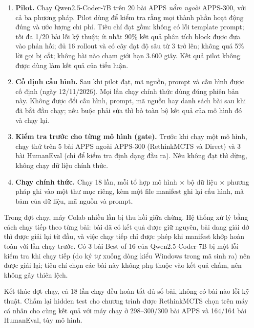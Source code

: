 \begin{enumerate}[label=\arabic*.]
  \item \textbf{Pilot.} Chạy Qwen2.5-Coder-7B trên 20 bài APPS \emph{nằm ngoài} APPS-300, với cả ba phương pháp. Pilot dùng để kiểm tra rằng mọi thành phần hoạt động đúng và ước lượng chi phí. Tiêu chí đạt gồm: không có lỗi template prompt; tối đa 1/20 bài lỗi kỹ thuật; ít nhất 90\% kết quả phân tích block được đưa vào phản hồi; đủ 16 rollout và có cây đạt độ sâu từ 3 trở lên; không quá 5\% lời gọi bị cắt; không bài nào chạm giới hạn 3.600 giây. Kết quả pilot không được dùng làm kết quả của tiểu luận.
  \item \textbf{Cố định cấu hình.} Sau khi pilot đạt, mã nguồn, prompt và cấu hình được cố định (ngày 12/11/2026). Mọi lần chạy chính thức dùng đúng phiên bản này. Không được đổi cấu hình, prompt, mã nguồn hay danh sách bài sau khi đã bắt đầu chạy; nếu buộc phải sửa thì bỏ toàn bộ kết quả của mô hình đó và chạy lại.
  \item \textbf{Kiểm tra trước cho từng mô hình (gate).} Trước khi chạy một mô hình, chạy thử trên 5 bài APPS ngoài APPS-300 (RethinkMCTS và Direct) và 3 bài HumanEval (chỉ để kiểm tra định dạng đầu ra). Nếu không đạt thì dừng, không chạy dữ liệu chính thức.
  \item \textbf{Chạy chính thức.} Chạy 18 lần, mỗi tổ hợp mô hình $\times$ bộ dữ liệu $\times$ phương pháp ghi vào một thư mục riêng, kèm một file manifest ghi lại cấu hình, mã băm của dữ liệu, mã nguồn và prompt.
\end{enumerate}

Trong đợt chạy, máy Colab nhiều lần bị thu hồi giữa chừng. Hệ thống xử lý bằng cách chạy tiếp theo từng bài: bài đã có kết quả được giữ nguyên, bài đang giải dở thì được giải lại từ đầu, và việc chạy tiếp chỉ được phép khi manifest khớp hoàn toàn với lần chạy trước. Có 3 bài Best-of-16 của Qwen2.5-Coder-7B bị một lỗi kiểm tra khi chạy tiếp (do ký tự xuống dòng kiểu Windows trong mã sinh ra) nên được giải lại; tiêu chí chọn các bài này không phụ thuộc vào kết quả chấm, nên không gây thiên lệch.

Kết thúc đợt chạy, cả 18 lần chạy đều hoàn tất đủ số bài, không có bài nào lỗi kỹ thuật. Chấm lại hidden test cho chương trình được RethinkMCTS chọn trên máy cá nhân cho cùng kết quả với máy chạy ở 298--300/300 bài APPS và 164/164 bài HumanEval, tùy mô hình.
